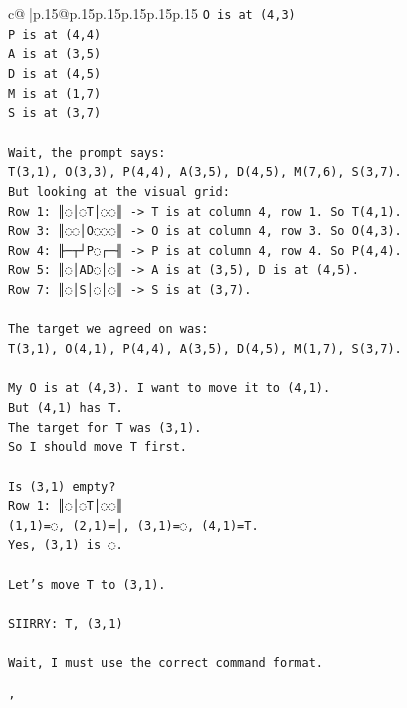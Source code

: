 \documentclass{article}
\begin{document}
{\begin{supertabular}{c@{$\;$}|p{.15\linewidth}@{}p{.15\linewidth}p{.15\linewidth}p{.15\linewidth}p{.15\linewidth}p{.15\linewidth}}
{{{\texttt{O is at (4,3)} \\
\texttt{P is at (4,4)} \\
\texttt{A is at (3,5)} \\
\texttt{D is at (4,5)} \\
\texttt{M is at (1,7)} \\
\texttt{S is at (3,7)} \\
\\ 
\texttt{Wait, the prompt says:} \\
\texttt{T(3,1), O(3,3), P(4,4), A(3,5), D(4,5), M(7,6), S(3,7).} \\
\texttt{But looking at the visual grid:} \\
\texttt{Row 1: ║◌│◌T│◌◌║ {-}> T is at column 4, row 1. So T(4,1).} \\
\texttt{Row 3: ║◌◌│O◌◌◌║ {-}> O is at column 4, row 3. So O(4,3).} \\
\texttt{Row 4: ╟─┬┘P◌┌─╢ {-}> P is at column 4, row 4. So P(4,4).} \\
\texttt{Row 5: ║◌│AD◌│◌║ {-}> A is at (3,5), D is at (4,5).} \\
\texttt{Row 7: ║◌│S│◌│◌║ {-}> S is at (3,7).} \\
\\ 
\texttt{The target we agreed on was:} \\
\texttt{T(3,1), O(4,1), P(4,4), A(3,5), D(4,5), M(1,7), S(3,7).} \\
\\ 
\texttt{My O is at (4,3). I want to move it to (4,1).} \\
\texttt{But (4,1) has T.} \\
\texttt{The target for T was (3,1).} \\
\texttt{So I should move T first.} \\
\\ 
\texttt{Is (3,1) empty?} \\
\texttt{Row 1: ║◌│◌T│◌◌║} \\
\texttt{(1,1)=◌, (2,1)=│, (3,1)=◌, (4,1)=T.} \\
\texttt{Yes, (3,1) is ◌.} \\
\\ 
\texttt{Let's move T to (3,1).} \\
\\ 
\texttt{SIIRRY: T, (3,1)} \\
\\ 
\texttt{Wait, I must use the correct command format.} \\
\\ 
\texttt{'} \\
}}}
\end{supertabular}}
\end{document}
